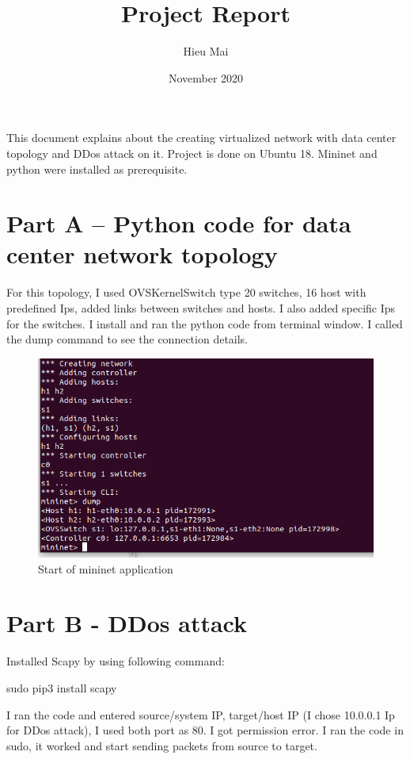 \documentclass{article}
\title{Project Report}
\author{Hieu Mai }
\date{November 2020}
\begin{document}
\maketitle
\label{intro}
This document explains about the creating virtualized network with data center topology and DDos attack on it. Project is done on Ubuntu 18. Mininet and python were installed as prerequisite.
\section{Part A – Python code for data center network topology}
\label{}
For this topology, I used OVSKernelSwitch type 20 switches, 16 host with predefined Ips, added links between switches and hosts. I also added specific Ips for the switches. I install and ran the python code from terminal window. I called the dump command to see the connection details. 

\begin{figure}[ht]
\centerline{\includegraphics[scale=0.8]{parta.PNG}}
\caption{Start of mininet application}
\label{fig}
\end{figure}

\section{Part B - DDos attack}
\label{}
Installed Scapy by using following command:

sudo pip3 install scapy

I ran the code and entered source/system IP, target/host IP (I chose 10.0.0.1 Ip for DDos attack), I used both port as 80. I got permission error. I ran the code in sudo, it worked and start sending packets from source to target.
\end{document}
